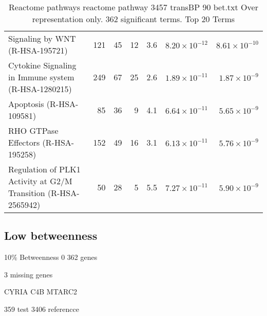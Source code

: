 \begin{table}[ht]
\begin{adjustbox}{width=\textwidth}
\begin{tabular}{lrrrrrr}
  Signaling by WNT (R-HSA-195721) & 121 & 45 & 12 & 3.6 & $8.20 \times 10^{-12}$ & $8.61 \times 10^{-10}$ \\ 
  Cytokine Signaling in Immune system (R-HSA-1280215) & 249 & 67 & 25 & 2.6 & $1.89 \times 10^{-11}$ & $1.87 \times 10^{-9}$ \\ 
  Apoptosis (R-HSA-109581) & 85 & 36 & 9 & 4.1 & $6.64 \times 10^{-11}$ & $5.65 \times 10^{-9}$ \\ 
  RHO GTPase Effectors (R-HSA-195258) & 152 & 49 & 16 & 3.1 & $6.13 \times 10^{-11}$ & $5.76 \times 10^{-9}$ \\ 
  Regulation of PLK1 Activity at G2/M Transition (R-HSA-2565942) & 50 & 28 & 5 & 5.5 & $7.27 \times 10^{-11}$ & $5.90 \times 10^{-9}$ \\ 
   \hline
\end{tabular}
\end{adjustbox}
\caption{Reactome pathways reactome pathway 3457 transBP 90 bet.txt Over representation only. 362 significant terms. Top 20 Terms} 
\label{tab:Reactome pathways reactome pathway 3457 transBP 90 bet.txt Over representation only. 362 significant terms. Top 20 Terms}
\end{table}

\clearpage
\subsection{Low betweenness}

10\% Betweenness 0 362 genes

3 missing genes

CYRIA
C4B
MTARC2

359 test 3406 referencce

